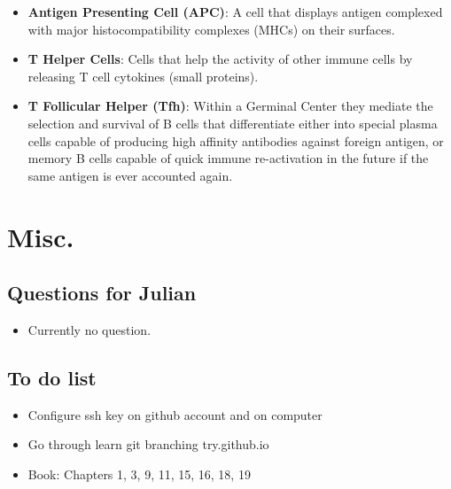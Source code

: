 \documentclass[english]{article}
\begin{document}
\begin{itemize}
\item \textbf{Antigen Presenting Cell (APC)}: A cell that displays antigen complexed with major histocompatibility complexes (MHCs) on their surfaces.

\item \textbf{T Helper Cells}: Cells that help the activity of other immune cells by releasing T cell cytokines (small proteins).

\item \textbf{T Follicular Helper (Tfh)}: Within a Germinal Center they mediate the selection and survival of B cells that differentiate either into special plasma cells capable of producing high affinity antibodies against foreign antigen, or memory B cells capable of quick immune re-activation in the future if the same antigen is ever accounted again. 


\end{itemize}

\section{Misc.}
\subsection{Questions for Julian}
\begin{itemize}

\item Currently no question. 


\end{itemize}

\subsection{To do list}

\begin{itemize}

\item Configure ssh key on github account and on computer

\item Go through learn git branching try.github.io

\item Book: Chapters 1, 3, 9, 11, 15, 16, 18, 19 

\end{itemize}
\end{document}
